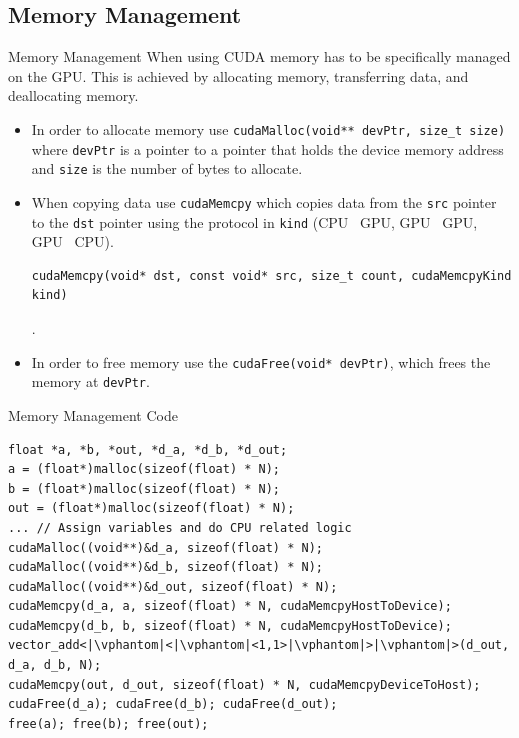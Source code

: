\documentclass[aspectratio=169]{beamer}
\begin{document}
\subsection{Memory Management}

\begin{frame}[fragile]{Memory Management}
	When using CUDA memory has to be specifically managed on the GPU. This is achieved by allocating memory, transferring data, and deallocating memory.
	\begin{itemize}
		\item In order to allocate memory use \texttt{cudaMalloc(void** devPtr, size_t size)} where \texttt{devPtr} is a pointer to a pointer that holds the device memory address and \texttt{size} is the number of bytes to allocate.
		\item When copying data use \texttt{cudaMemcpy} which copies data from the \texttt{src} pointer to the \texttt{dst} pointer using the protocol in \texttt{kind} (CPU \rightarrow \, GPU, GPU \rightarrow \, GPU, GPU \rightarrow \, CPU).

		      \begin{verbatim}
cudaMemcpy(void* dst, const void* src, size_t count, cudaMemcpyKind kind)
			\end{verbatim}.
		\item In order to free memory use the \texttt{cudaFree(void* devPtr)}, which frees the memory at \texttt{devPtr}.
	\end{itemize}
\end{frame}

\begin{frame}[fragile]{Memory Management Code}
	\begin{verbatim}
float *a, *b, *out, *d_a, *d_b, *d_out;
a = (float*)malloc(sizeof(float) * N);
b = (float*)malloc(sizeof(float) * N);
out = (float*)malloc(sizeof(float) * N);
... // Assign variables and do CPU related logic
cudaMalloc((void**)&d_a, sizeof(float) * N);
cudaMalloc((void**)&d_b, sizeof(float) * N);
cudaMalloc((void**)&d_out, sizeof(float) * N);
cudaMemcpy(d_a, a, sizeof(float) * N, cudaMemcpyHostToDevice);
cudaMemcpy(d_b, b, sizeof(float) * N, cudaMemcpyHostToDevice);
vector_add<|\vphantom|<|\vphantom|<1,1>|\vphantom|>|\vphantom|>(d_out, d_a, d_b, N);
cudaMemcpy(out, d_out, sizeof(float) * N, cudaMemcpyDeviceToHost);
cudaFree(d_a); cudaFree(d_b); cudaFree(d_out);
free(a); free(b); free(out);
	\end{verbatim}

\end{frame}
\end{document}
